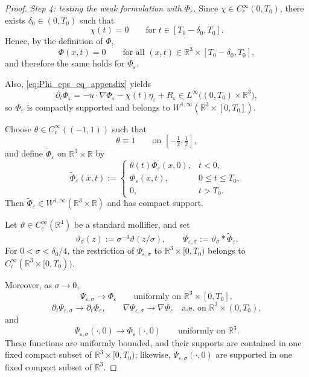 \documentclass[10pt,a4paper]{amsart}
\begin{document}
\begin{proof}
\smallskip
\noindent\emph{Step 4: testing the weak formulation with $\Phi_\varepsilon$.}
Since $\chi\in C_c^\infty(0,T_0)$, there exists $\delta_0\in(0,T_0)$ such that
\[
\chi(t)=0
\qquad\text{for }t\in[T_0-\delta_0,T_0].
\]
Hence, by the definition of $\Phi$,
\[
\Phi(x,t)=0
\qquad\text{for all }(x,t)\in\mathbb R^3\times[T_0-\delta_0,T_0],
\]
and therefore the same holds for $\Phi_\varepsilon$.

Also, \eqref{eq:Phi_eps_eq_appendix} yields
\[
\partial_t\Phi_\varepsilon
=
-u\cdot\nabla\Phi_\varepsilon-\chi(t)\eta_\varepsilon+R_\varepsilon
\in L^\infty\bigl((0,T_0)\times\mathbb R^3\bigr),
\]
so $\Phi_\varepsilon$ is compactly supported and belongs to
$W^{1,\infty}(\mathbb R^3\times[0,T_0])$.

Choose $\theta\in C_c^\infty((-1,1))$ such that
\[
\theta\equiv 1
\qquad\text{on }[-\tfrac12,\tfrac12],
\]
and define $\widetilde{\Phi}_\varepsilon$ on $\mathbb R^3\times\mathbb R$ by
\[
\widetilde{\Phi}_\varepsilon(x,t):=
\begin{cases}
\theta(t)\Phi_\varepsilon(x,0), & t<0,\\[1mm]
\Phi_\varepsilon(x,t), & 0\le t\le T_0,\\[1mm]
0, & t>T_0.
\end{cases}
\]
Then $\widetilde{\Phi}_\varepsilon\in W^{1,\infty}(\mathbb R^3\times\mathbb R)$ and has
compact support.

Let $\vartheta\in C_c^\infty(\mathbb R^4)$ be a standard mollifier, and set
\[
\vartheta_\sigma(z):=\sigma^{-4}\vartheta(z/\sigma),
\qquad
\Psi_{\varepsilon,\sigma}:=\vartheta_\sigma*\widetilde{\Phi}_\varepsilon.
\]
For $0<\sigma<\delta_0/4$, the restriction of $\Psi_{\varepsilon,\sigma}$ to
$\mathbb R^3\times[0,T_0)$ belongs to
$C_c^\infty(\mathbb R^3\times[0,T_0))$.

Moreover, as $\sigma\to0$,
\[
\Psi_{\varepsilon,\sigma}\to \Phi_\varepsilon
\qquad\text{uniformly on }\mathbb R^3\times[0,T_0],
\]
\[
\partial_t\Psi_{\varepsilon,\sigma}\to \partial_t\Phi_\varepsilon,
\qquad
\nabla\Psi_{\varepsilon,\sigma}\to \nabla\Phi_\varepsilon
\quad\text{a.e. on }\mathbb R^3\times(0,T_0),
\]
and
\[
\Psi_{\varepsilon,\sigma}(\cdot,0)\to \Phi_\varepsilon(\cdot,0)
\qquad\text{uniformly on }\mathbb R^3.
\]
These functions are uniformly bounded, and their supports are contained in one fixed compact
subset of $\mathbb R^3\times[0,T_0)$; likewise,
$\Psi_{\varepsilon,\sigma}(\cdot,0)$ are supported in one fixed compact subset of
$\mathbb R^3$.


\end{proof}
\end{document}
